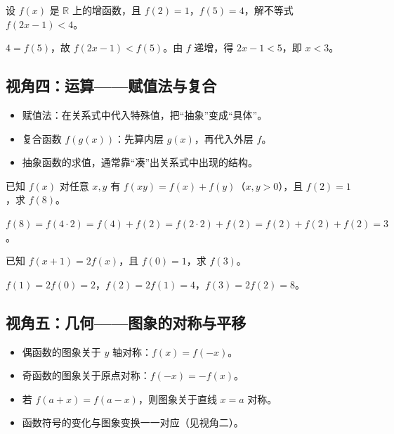 \begin{explore}
\begin{problem}
设 $f(x)$ 是 $\mathbb{R}$ 上的增函数，且 $f(2)=1$，$f(5)=4$，解不等式 $f(2x-1)<4$。
\end{problem}
\begin{solution}
$4=f(5)$，故 $f(2x-1)<f(5)$。由 $f$ 递增，得 $2x-1<5$，即 $x<3$。
\end{solution}

\subsection{视角四：运算——赋值法与复合}

\begin{itemize}
  \item 赋值法：在关系式中代入特殊值，把“抽象”变成“具体”。
  \item 复合函数 $f(g(x))$：先算内层 $g(x)$，再代入外层 $f$。
  \item 抽象函数的求值，通常靠“凑”出关系式中出现的结构。
\end{itemize}

\begin{example}
已知 $f(x)$ 对任意 $x,y$ 有 $f(xy)=f(x)+f(y)$（$x,y>0$），且 $f(2)=1$，求 $f(8)$。
\end{example}
\begin{solution}
$f(8)=f(4\cdot2)=f(4)+f(2)=f(2\cdot2)+f(2)=f(2)+f(2)+f(2)=3$。
\end{solution}

\begin{problem}
已知 $f(x+1)=2f(x)$，且 $f(0)=1$，求 $f(3)$。
\end{problem}
\begin{solution}
$f(1)=2f(0)=2$，$f(2)=2f(1)=4$，$f(3)=2f(2)=8$。
\end{solution}

\subsection{视角五：几何——图象的对称与平移}

\begin{itemize}
  \item 偶函数的图象关于 $y$ 轴对称：$f(x)=f(-x)$。
  \item 奇函数的图象关于原点对称：$f(-x)=-f(x)$。
  \item 若 $f(a+x)=f(a-x)$，则图象关于直线 $x=a$ 对称。
  \item 函数符号的变化与图象变换一一对应（见视角二）。
\end{itemize}


\end{explore}
